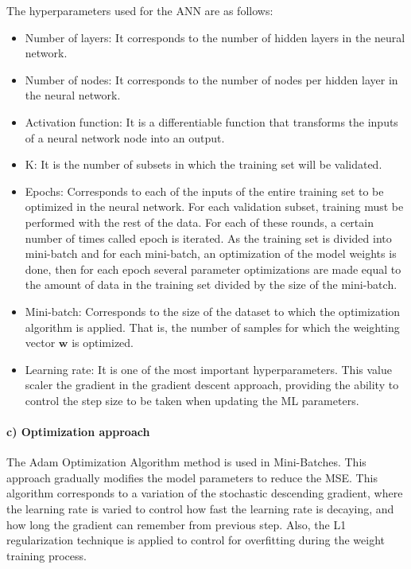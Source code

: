 \documentclass[conference]{IEEEtran}
\begin{document}
The hyperparameters used for the ANN are as follows:

\begin{itemize}

\item{Number of layers:}
It corresponds to the number of hidden layers in the neural network.

\item{Number of nodes:} 
It corresponds to the number of nodes per hidden layer in the neural network.

\item{Activation function:}
It is a differentiable function that transforms the inputs of a neural network node into an output. 

\item{$\mathrm{K}$:}
It is the number of subsets in which the training set will be validated.

\item{Epochs:}
Corresponds to each of the inputs of the entire training set to be optimized in the neural network. For each validation subset, training must be performed with the rest of the data. For each of these rounds, a certain number of times called epoch is iterated. As the training set is divided into mini-batch and for each mini-batch, an optimization of the model weights is done, then for each epoch several parameter optimizations are made equal to the amount of data in the training set divided by the size of the mini-batch.

\item{Mini-batch:}
Corresponds to the size of the dataset to which the optimization algorithm is applied. That is, the number of samples for which the weighting vector $\boldsymbol{w}$ is optimized.

\item{Learning rate:}
It is one of the most important hyperparameters. This value scaler the gradient in the gradient descent approach, providing the ability to control the step size to be taken when updating the ML parameters.

\end{itemize}

\paragraph*{c) Optimization approach} 

The Adam Optimization Algorithm method is used in Mini-Batches. This approach gradually modifies the model parameters to reduce the MSE. This algorithm corresponds to a variation of the stochastic descending gradient, where the learning rate is varied to control how fast the learning rate is decaying, and how long the gradient can remember from previous step. Also, the L1 regularization technique is applied to control for overfitting during the weight training process.
\end{document}
